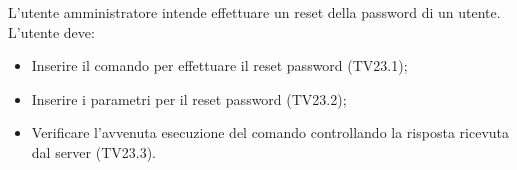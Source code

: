 \documentclass{scalatekids-article}
\begin{document}
L'utente amministratore intende effettuare un reset della password di un utente.\\
L'utente deve:
\begin{itemize}
\item Inserire il comando per effettuare il reset password (TV23.1);
\item Inserire i parametri per il reset password (TV23.2);
\item Verificare l'avvenuta esecuzione del comando controllando la risposta ricevuta dal server (TV23.3).
\end{itemize}

\listoffigures
\end{document}
